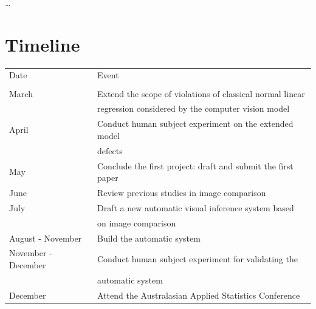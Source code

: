 \documentclass{monashthesis}
\theoremstyle{definition}
\theoremstyle{definition}
\theoremstyle{definition}
\theoremstyle{definition}
\theoremstyle{remark}
\begin{document}
\ldots{}

\hypertarget{timeline}{%
\chapter{Timeline}\label{timeline}}

\begin{table} \label{tab:timeline}
\centering
\begin{tabular}[t]{ll}
\toprule
\addlinespace[0.5em]
Date & Event\\
\addlinespace[0.5em]
\midrule
\addlinespace[0.5em]
\multicolumn{2}{l}{\textit{\textbf{2022}}}\\
\hspace{4em}March & Extend the scope of violations of classical normal linear\\ 
\addlinespace[0.5em]
\hspace{4em} & regression considered by the computer vision model\\
\addlinespace[0.5em]
\hspace{4em}April & Conduct human subject experiment on the extended model\\ 
\addlinespace[0.5em]
\hspace{4em} & defects\\
\addlinespace[0.5em]
\hspace{4em}May & Conclude the first project: draft and submit the first paper\\
\addlinespace[0.5em]
\hspace{4em}June & Review previous studies in image comparison\\
\addlinespace[0.5em]
\hspace{4em}July & Draft a new automatic visual inference system based\\
\addlinespace[0.5em]
\hspace{4em} & on image comparison\\
\addlinespace[0.5em]
\hspace{4em}August - November & Build the automatic system\\
\addlinespace[0.5em]
\hspace{4em}November - December & Conduct human subject experiment for validating the\\
\addlinespace[0.5em]
\hspace{4em} & automatic system\\
\addlinespace[0.5em]
\hspace{4em}December & Attend the Australasian Applied Statistics Conference\\

\end{tabular}
\end{table}
\end{document}
